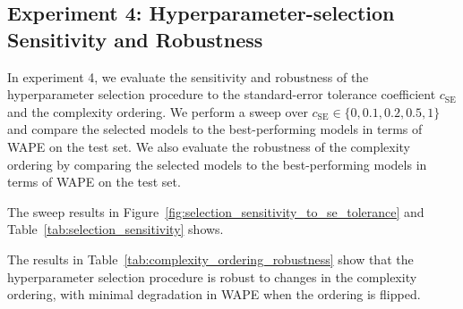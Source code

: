 \subsection{Experiment 4: Hyperparameter-selection Sensitivity and Robustness}

In experiment 4, we evaluate the sensitivity and robustness of the hyperparameter selection procedure to the standard-error tolerance coefficient \(c_{\mathrm{SE}}\) and the complexity ordering. We perform a sweep over \(c_{\mathrm{SE}} \in \{0, 0.1, 0.2, 0.5, 1\}\) and compare the selected models to the best-performing models in terms of WAPE on the test set. We also evaluate the robustness of the complexity ordering by comparing the selected models to the best-performing models in terms of WAPE on the test set.




The sweep results in Figure~\ref{fig:selection_sensitivity_to_se_tolerance} and Table~\ref{tab:selection_sensitivity} shows.

% 


The results in Table~\ref{tab:complexity_ordering_robustness} show that the hyperparameter selection procedure is robust to changes in the complexity ordering, with minimal degradation in WAPE when the ordering is flipped.

